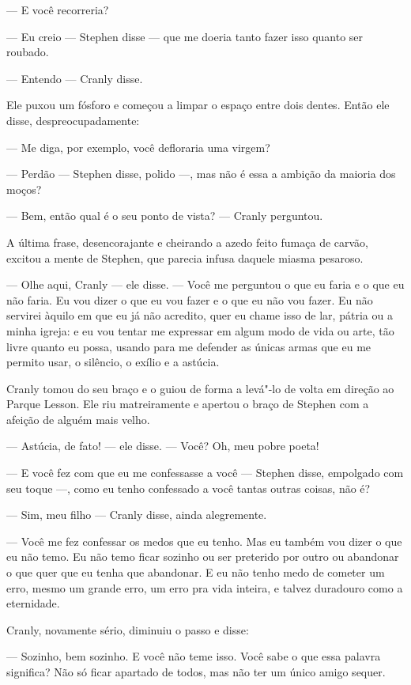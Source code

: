  --- E você recorreria?

 --- Eu creio --- Stephen disse --- que me doeria tanto fazer isso quanto ser
roubado.

 --- Entendo --- Cranly disse.

Ele puxou um fósforo e começou a limpar o espaço entre dois dentes.
Então ele disse, despreocupadamente:

 --- Me diga, por exemplo, você defloraria uma virgem?

 --- Perdão --- Stephen disse, polido ---, mas não é essa a ambição da maioria dos
moços?

 --- Bem, então qual é o seu ponto de vista? --- Cranly perguntou.

A última frase, desencorajante e cheirando a azedo feito fumaça de
carvão, excitou a mente de Stephen, que parecia infusa daquele miasma
pesaroso.

 --- Olhe aqui, Cranly --- ele disse. --- Você me perguntou o que eu faria e o que
eu não faria. Eu vou dizer o que eu vou fazer e o que eu não vou fazer.
Eu não servirei àquilo em que eu já não acredito, quer eu chame isso de
lar, pátria ou a minha igreja: e eu vou tentar me expressar em algum
modo de vida ou arte, tão livre quanto eu possa, usando para me
defender as únicas armas que eu me permito usar, o silêncio, o exílio e
a astúcia.

Cranly tomou do seu braço e o guiou de forma a levá"-lo de volta em
direção ao Parque Lesson. Ele riu matreiramente e apertou o braço de
Stephen com a afeição de alguém mais velho.

 --- Astúcia, de fato! --- ele disse. --- Você? Oh, meu pobre poeta!

 --- E você fez com que eu me confessasse a você --- Stephen disse, empolgado
com seu toque ---, como eu tenho confessado a você tantas outras coisas,
não é?

 --- Sim, meu filho --- Cranly disse, ainda alegremente.

 --- Você me fez confessar os medos que eu tenho. Mas eu também vou dizer o
que eu não temo. Eu não temo ficar sozinho ou ser preterido por outro
ou abandonar o que quer que eu tenha que abandonar. E eu não tenho medo
de cometer um erro, mesmo um grande erro, um erro pra vida inteira, e
talvez duradouro como a eternidade.

Cranly, novamente sério, diminuiu o passo e disse:

 --- Sozinho, bem sozinho. E você não teme isso. Você sabe o que essa
palavra significa? Não só ficar apartado de todos, mas não ter um único
amigo sequer.

